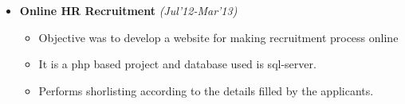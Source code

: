 \\[-0.8cm]\\
\begin{itemize}
	\item \textbf{Online HR Recruitment} \hfill \emph{(Jul'12-Mar'13)} \\[-0.4cm]
	\begin{itemize}
	      \item Objective was to develop a website for making recruitment process online\\[-0.4cm]
	      \item It is a php based project and database used is sql-server.\\[-0.4cm]
	      \item Performs shorlisting according to the details filled by the applicants.\\[-0.4cm]
	\end{itemize}
\end{itemize}
